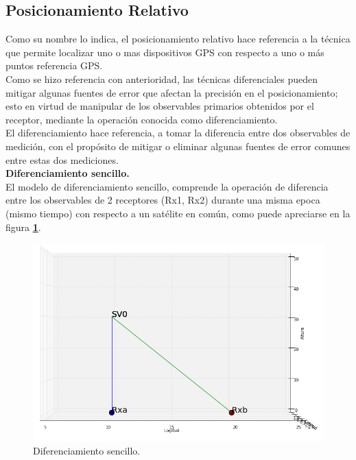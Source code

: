 \subsection{Posicionamiento Relativo %
}

Como su nombre lo indica, el posicionamiento relativo hace referencia a la técnica que permite localizar uno o mas dispositivos GPS con respecto a uno o más puntos referencia GPS.\\

Como se hizo referencia con anterioridad, las técnicas diferenciales pueden mitigar algunas fuentes de error que afectan la precisión en el posicionamiento; esto en virtud de manipular de los observables primarios obtenidos por el receptor, mediante la operación conocida como diferenciamiento.\\

El diferenciamiento hace referencia, a tomar la diferencia entre dos observables de medición, con el propósito de mitigar o eliminar algunas fuentes de error comunes entre estas dos mediciones.\\

\textbf{Diferenciamiento sencillo. %
}\\

El modelo de diferenciamiento sencillo, comprende la operación de diferencia entre los observables de 2 receptores (Rx1, Rx2) durante una misma epoca (mismo tiempo) con respecto a un satélite en común, como puede apreciarse en la figura \textbf{\ref{fig:SingleDifferencing}}.\\

\begin{figure}[ht]
	\centering
	\includegraphics[scale=0.4]{Imagenes/SingleDifferencing.png}
	\caption{Diferenciamiento sencillo.}
	\label{fig:SingleDifferencing}
\end{figure}

